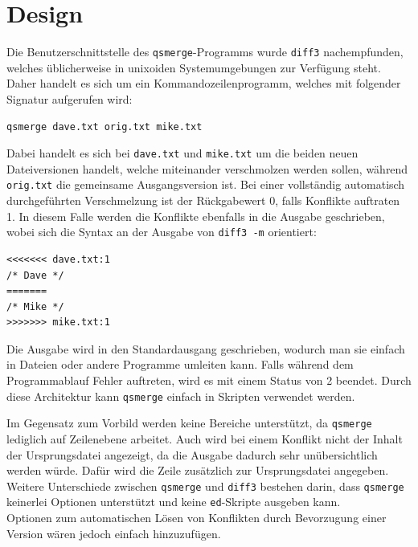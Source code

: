 \documentclass[a4paper,titlepage,12pt]{scrartcl}
\begin{document}
\section{Design}
\label{sec:design}
Die Benutzerschnittstelle des \texttt{qsmerge}-Programms wurde \texttt{diff3} nachempfunden,
welches üblicherweise in unixoiden Systemumgebungen zur Verfügung steht.
Daher handelt es sich um ein Kommandozeilenprogramm,
welches mit folgender Signatur aufgerufen wird:
\lstset{language=sh, numbers=none, xleftmargin=0pt}
\begin{lstlisting}
qsmerge dave.txt orig.txt mike.txt
\end{lstlisting}
Dabei handelt es sich bei \texttt{dave.txt} und \texttt{mike.txt} um die beiden neuen Dateiversionen handelt,
welche miteinander verschmolzen werden sollen,
während \texttt{orig.txt} die gemeinsame Ausgangsversion ist.
Bei einer vollständig automatisch durchgeführten Verschmelzung ist der Rückgabewert 0,
falls Konflikte auftraten 1.
In diesem Falle werden die Konflikte ebenfalls in die Ausgabe geschrieben,
wobei sich die Syntax an der Ausgabe von \texttt{diff3 -m} orientiert:
\begin{verbatim}
<<<<<<< dave.txt:1
/* Dave */
=======
/* Mike */
>>>>>>> mike.txt:1
\end{verbatim}
Die Ausgabe wird in den Standardausgang geschrieben,
wodurch man sie einfach in Dateien oder andere Programme umleiten kann.
Falls während dem Programmablauf Fehler auftreten,
wird es mit einem Status von 2 beendet.
Durch diese Architektur kann \texttt{qsmerge} einfach in Skripten verwendet werden.

Im Gegensatz zum Vorbild werden keine Bereiche unterstützt,
da \texttt{qsmerge} lediglich auf Zeilenebene arbeitet.
Auch wird bei einem Konflikt nicht der Inhalt der Ursprungsdatei angezeigt,
da die Ausgabe dadurch sehr unübersichtlich werden würde.
Dafür wird die Zeile zusätzlich zur Ursprungsdatei angegeben.
Weitere Unterschiede zwischen \texttt{qsmerge} und \texttt{diff3} bestehen darin,
dass \texttt{qsmerge} keinerlei Optionen unterstützt und keine \texttt{ed}-Skripte ausgeben kann.
\\
Optionen zum automatischen Lösen von Konflikten durch Bevorzugung einer Version wären jedoch einfach hinzuzufügen.
\end{document}
